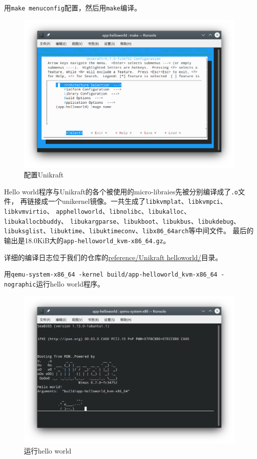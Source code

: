 \documentclass{../runikraft-report}
\begin{document}
用\texttt{make menuconfig}配置，然后用\texttt{make}编译。
\begin{figure}[!hbt]
\centering
\includegraphics[width=0.9\linewidth]{assets/unikraft-menuconfig}
\caption{配置Unikraft}
\label{fig:unikraft-menuconfig}
\end{figure}
Hello world程序与Unikraft的各个被使用的micro-libraies先被分别编译成了\texttt{.o}文件，
再链接成一个unikernel镜像。一共生成了\texttt{libkvmplat}、\texttt{libkvmpci}、\texttt{libkvmvirtio}、
\texttt{apphelloworld}、\texttt{libnolibc}、\texttt{libukalloc}、\texttt{libukallocbbuddy}、
\texttt{libukargparse}、\texttt{libukboot}、\texttt{libukbus}、\texttt{libukdebug}、
\texttt{libuksglist}、\texttt{libuktime}、\texttt{libuktimeconv}、\texttt{libx86\_64arch}等中间文件。
最后的输出是18.0KiB大的\texttt{app-\linebreak helloworld\_kvm-x86\_64.gz}。

详细的编译日志位于我们的仓库的\href{https://github.com/OSH-2022/x-runikraft/tree/d22ccf0c1b248667148fd8953b71b6e0258de6a3/reference/Unikraft%20helloworld}{reference/Unikraft helloworld/}目录。

用\texttt{qemu-system-x86\_64 -kernel build/app-helloworld\_kvm-x86\_64 -nographic}\linebreak 运行hello world程序。

\begin{figure}[tbh!]
\centering
\includegraphics[width=0.9\linewidth]{assets/unikraft-run}
\caption{运行hello world}
\label{fig:unikraft-run}
\end{figure}
\end{document}
